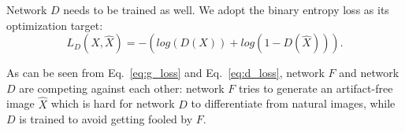 \documentclass[10pt,twocolumn,letterpaper]{article}
\begin{document}
Network $D$ needs to be trained as well. We adopt the binary entropy loss as its optimization target:
\begin{equation}
L_{D}(X, \hat{X}) = -\left(log(D(X)) + log(1 - D(\hat{X}))\right).
\label{eq:d_loss}
\end{equation}

As can be seen from Eq.~\eqref{eq:g_loss} and Eq.~\eqref{eq:d_loss}, network $F$ and network $D$ are competing against each other: network $F$ tries to generate an artifact-free image $\hat{X}$ which is hard for network $D$ to differentiate from natural images, while $D$ is trained to avoid getting fooled by $F$.

\begin{table}
\begin{center}
\caption{Comparison of DCGAN and our network $D$. ``conv" is short for convolution. Each convolutional layer except the last is followed by a Batch Normalization and a Leaky ReLU, sequentially. The filter size is always $4 \times 4$. The filter numbers are shown right after ``conv".}
\vspace{-1em}
\end{center}
\vspace{-1.5em}
\end{table}
\end{document}
